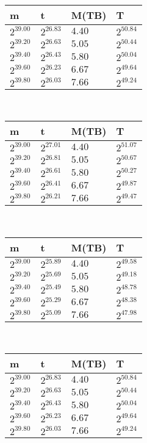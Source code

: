  \ 
\begin{tabular}{llll}
m & t & M(TB) & T \\ \hline
$2^{39.00}$ & $2^{26.83}$ & $4.40$ & $2^{50.84}$ \\
$2^{39.20}$ & $2^{26.63}$ & $5.05$ & $2^{50.44}$ \\
$2^{39.40}$ & $2^{26.43}$ & $5.80$ & $2^{50.04}$ \\
$2^{39.60}$ & $2^{26.23}$ & $6.67$ & $2^{49.64}$ \\
$2^{39.80}$ & $2^{26.03}$ & $7.66$ & $2^{49.24}$ \\
\end{tabular}
 \ 
\begin{tabular}{llll}
m & t & M(TB) & T \\ \hline
$2^{39.00}$ & $2^{27.01}$ & $4.40$ & $2^{51.07}$ \\
$2^{39.20}$ & $2^{26.81}$ & $5.05$ & $2^{50.67}$ \\
$2^{39.40}$ & $2^{26.61}$ & $5.80$ & $2^{50.27}$ \\
$2^{39.60}$ & $2^{26.41}$ & $6.67$ & $2^{49.87}$ \\
$2^{39.80}$ & $2^{26.21}$ & $7.66$ & $2^{49.47}$ \\
\end{tabular}
 \ 
\begin{tabular}{llll}
m & t & M(TB) & T \\ \hline
$2^{39.00}$ & $2^{25.89}$ & $4.40$ & $2^{49.58}$ \\
$2^{39.20}$ & $2^{25.69}$ & $5.05$ & $2^{49.18}$ \\
$2^{39.40}$ & $2^{25.49}$ & $5.80$ & $2^{48.78}$ \\
$2^{39.60}$ & $2^{25.29}$ & $6.67$ & $2^{48.38}$ \\
$2^{39.80}$ & $2^{25.09}$ & $7.66$ & $2^{47.98}$ \\
\end{tabular}
 \ 
\begin{tabular}{llll}
m & t & M(TB) & T \\ \hline
$2^{39.00}$ & $2^{26.83}$ & $4.40$ & $2^{50.84}$ \\
$2^{39.20}$ & $2^{26.63}$ & $5.05$ & $2^{50.44}$ \\
$2^{39.40}$ & $2^{26.43}$ & $5.80$ & $2^{50.04}$ \\
$2^{39.60}$ & $2^{26.23}$ & $6.67$ & $2^{49.64}$ \\
$2^{39.80}$ & $2^{26.03}$ & $7.66$ & $2^{49.24}$ \\
\end{tabular}
